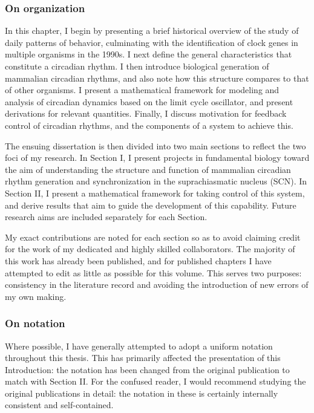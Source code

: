 \subsubsection*{On organization}
In this chapter, I begin by presenting a brief historical overview of the study of daily patterns of behavior, culminating with the identification of clock genes in multiple organisms in the 1990s.
I next define the general characteristics that constitute a circadian rhythm.
I then introduce biological generation of mammalian circadian rhythms, and also note how this structure compares to that of other organisms.
I present a mathematical framework for modeling and analysis of circadian dynamics based on the limit cycle oscillator, and present derivations for relevant quantities.
Finally, I discuss motivation for feedback control of circadian rhythms, and the components of a system to achieve this.

The ensuing dissertation is then divided into two main sections to reflect the two foci of my research.
In Section I, I present projects in fundamental biology toward the aim of understanding the structure and function of mammalian circadian rhythm generation and synchronization in the suprachiasmatic nucleus (SCN).
In Section II, I present a mathematical framework for taking control of this system, and derive results that aim to guide the development of this capability.
Future research aims are included separately for each Section.

My exact contributions are noted for each section so as to avoid claiming credit for the work of my dedicated and highly skilled collaborators.
The majority of this work has already been published, and for published chapters I have attempted to edit as little as possible for this volume.
This serves two purposes: consistency in the literature record and avoiding the introduction of new errors of my own making.

\subsubsection*{On notation}

Where possible, I have generally attempted to adopt a uniform notation throughout this thesis.
This has primarily affected the presentation of this Introduction: the notation has been changed from the original publication to match with Section II.
For the confused reader, I would recommend studying the original publications in detail: the notation in these is certainly internally consistent and self-contained.

